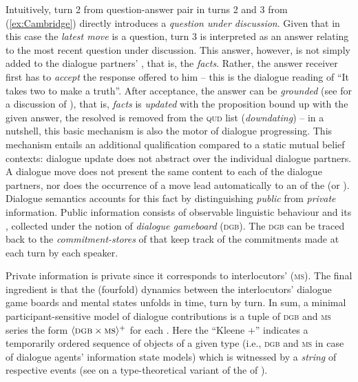 \documentclass[output=paper]{langsci/langscibook}
\begin{document}
{Intuitively, turn 2 from question-answer pair in turns 2 and 3 from (\ref{ex:Cambridge}) directly introduces a \emph{question under discussion}.
%
Given that in this case the \emph{latest move} is a question, turn 3 is interpreted as an answer relating to the most recent question under discussion.
%
This answer, however, is not simply added to the dialogue partners' , that is, the \emph{facts}.
%
Rather, the answer receiver first has to \emph{accept}  the response offered to him -- this is the dialogue reading of \enquote{It takes two to make a truth}.
%
After acceptance, the answer can be \emph{grounded}  (see \citet[Chap.~4]{Clark:1996} for a discussion of ), that is, \emph{facts} is \emph{updated}  with the proposition bound up with the given answer, the resolved  is removed from the \textsc{qud} list (\emph{downdating})  -- in a nutshell, this basic mechanism is also the motor of dialogue progressing. 
%
This mechanism entails an additional qualification compared to a static mutual belief contexts: dialogue update does not abstract over the individual dialogue partners.
%
A dialogue move does not present the same content to each of the dialogue partners, nor does the occurrence of a move lead automatically to an  of the  (or ).
%
Dialogue semantics accounts for this fact by distinguishing \emph{public}  from \emph{private} information.  
%
Public information consists of observable linguistic behaviour and its , collected under the notion of \emph{dialogue gameboard} (\textsc{dgb}). 
%
The \textsc{dgb} can be traced back to the \emph{commitment-stores}  of \citet{Hamblin:1970} that keep track of the commitments made at each turn by each speaker. 

Private information is private since it corresponds to interlocutors'  (\textsc{ms}).
%
The final ingredient is that the (fourfold) dynamics between the interlocutors' dialogue game boards and mental states unfolds in time, turn by turn.
%
In sum, a minimal participant-sensitive model of dialogue contributions is a tuple of \textsc{dgb} and \textsc{ms} series the form $\langle \textsc{dgb} \times \textsc{ms} \rangle^+$ for each . 
%
Here the \enquote{Kleene +} indicates a temporarily ordered sequence of objects of a given type (i.e., \textsc{dgb} and \textsc{ms} in case of dialogue agents' information state models)  which is witnessed by a \emph{string} of respective events (see \citet[Sec.~2.7]{Cooper:Ginzburg:2015} on a type-theoretical variant of the  of \citet{Fernando:2011}).

}
\end{document}

